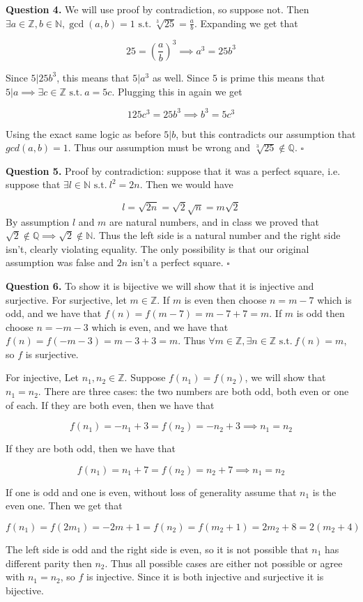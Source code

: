 \documentclass[letterpaper, reqno,11pt]{article}
\newcommand{\ZZ}{\mathbb{Z}}
\newcommand{\QQ}{\mathbb{Q}}
\newcommand{\NN}{\mathbb{N}}
\newcommand{\st}{\text{ s.t.}\ }
\begin{document}
{\noindent\bf Question 4.} We will use proof by contradiction, so suppose not. Then $\exists a\in\ZZ, b\in\NN, \gcd(a, b)=1\st \sqrt[3]{25}=\frac ab$. Expanding we get that 

\[
    25=(\frac ab)^3\implies a^3=25b^3
\]

Since $5|25b^3$, this means that $5|a^3$ as well. Since  $5$ is prime this means that $5|a\implies\exists c\in\ZZ\st a=5c$. Plugging this in again we get 

\[
    125c^3=25b^3\implies b^3=5c^3
\]

Using the exact same logic as before $5|b$, but this contradicts our assumption that $gcd(a, b)=1$. Thus our assumption must be wrong and $\sqrt[3]{25}\notin\QQ$. $\square$

{\noindent\bf Question 5.} Proof by contradiction: suppose that it was a perfect square, i.e. suppose that $\exists l\in\NN\st l^2=2n$. Then we would have 

\[
    l=\sqrt{2n}=\sqrt2\sqrt n=m\sqrt2
\]
By assumption $l$ and $m$ are natural numbers, and in class we proved that $\sqrt2\notin\QQ\implies \sqrt2\notin\NN$. Thus the left side is a natural number and the right side isn't, clearly violating equality. The only possibility is that our original assumption was false and $2n$ isn't a perfect square. $\square$

{\noindent\bf Question 6.} To show it is bijective we will show that it is injective and surjective. For surjective, let $m\in\ZZ$. If $m$ is even then choose $n=m-7$ which is odd, and we have that $f(n)=f(m-7)=m-7+7=m$. If $m$ is odd then choose $n=-m-3$ which is even, and we have that $f(n)=f(-m-3)=m-3+3=m$. Thus $\forall m\in\ZZ, \exists n\in\ZZ\st f(n)=m$, so $f$ is surjective. 

For injective, Let $n_1, n_2\in\ZZ$. Suppose $f(n_1)=f(n_2)$, we will show that $n_1=n_2$. There are three cases: the two numbers are both odd, both even or one of each. If they are both even, then we have that 

\[
    f(n_1)=-n_1+3=f(n_2)=-n_2+3\implies n_1=n_2
\]

If they are both odd, then we have that 

\[
    f(n_1)=n_1+7=f(n_2)=n_2+7\implies n_1=n_2
\]

If one is odd and one is even, without loss of generality assume that $n_1$ is the even one. Then we get that 

\[
    f(n_1)=f(2m_1)=-2m+1=f(n_2)=f(m_2+1)=2m_2+8=2(m_2+4)
\]

The left side is odd and the right side is even, so it is not possible that $n_1$ has different parity then $n_2$. Thus all possible cases are either not possible or agree with $n_1=n_2$, so $f$ is injective. Since it is both injective and surjective it is bijective. 
\end{document}
